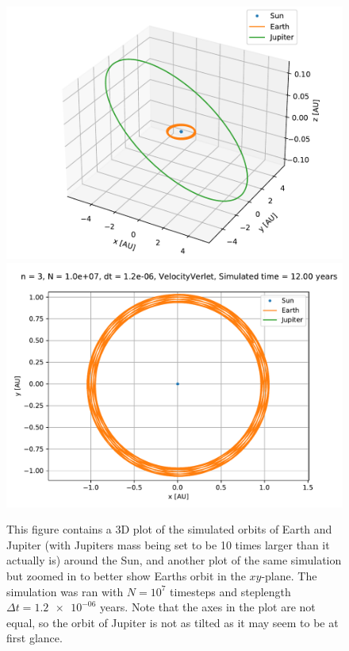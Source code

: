 \documentclass[reprint,english,notitlepage]{revtex4-1}  %
\begin{document}
\begin{figure}[H]
\includegraphics[width=\columnwidth]{../data/figures/sun-earth-jupiter/sej_10xM_vv_orbit3D.pdf}
\includegraphics[width=\columnwidth]{../data/figures/sun-earth-jupiter/sej_10xM_vv_orbit2D_zoomed.pdf}
\caption{This figure contains a 3D plot of the simulated orbits of Earth and Jupiter (with Jupiters mass being set to be 10 times larger than it actually is) around the Sun, and another plot of the same simulation but zoomed in to better show Earths orbit in the $xy$-plane. The simulation was ran with $N=10^7$ timesteps and steplength $\Delta t = \num{1.2e-06}$ years. Note that the axes in the plot are not equal, so the orbit of Jupiter is not as tilted as it may seem to be at first glance.}
\label{fig:sej-10}
\end{figure}
\end{document}
